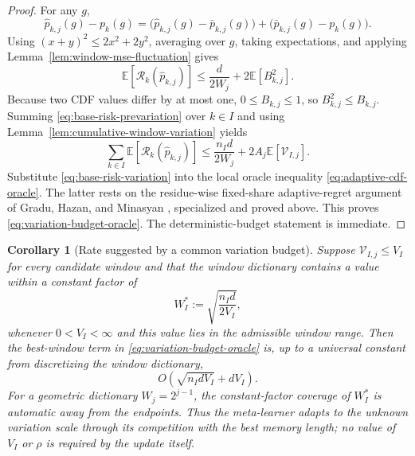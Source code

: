 \documentclass[11pt]{article}
\newtheorem{corollary}[theorem]{Corollary}
\newcommand{\E}{\mathbb{E}}
\newcommand{\1}{\mathbf{1}}
\begin{document}
\begin{proof}
For any $g$,
\[
    \widehat p_{k,j}(g)-p_k(g)
    =
    \bigl(\widehat p_{k,j}(g)-\bar p_{k,j}(g)\bigr)
    +
    \bigl(\bar p_{k,j}(g)-p_k(g)\bigr).
\]
Using $(x+y)^2\le2x^2+2y^2$, averaging over $g$, taking expectations, and
applying Lemma~\ref{lem:window-mse-fluctuation} gives
\begin{equation}
    \E[\mathcal R_k(\widehat p_{k,j})]
    \le
    \frac{d}{2W_j}
    +
    2\E[B_{k,j}^2].
    \label{eq:base-risk-prevariation}
\end{equation}
Because two CDF values differ by at most one, $0\le B_{k,j}\le1$, so
$B_{k,j}^2\le B_{k,j}$.  Summing
\eqref{eq:base-risk-prevariation} over $k\in I$ and using
Lemma~\ref{lem:cumulative-window-variation} yields
\begin{equation}
    \sum_{k\in I}
    \E[\mathcal R_k(\widehat p_{k,j})]
    \le
    \frac{n_I d}{2W_j}
    +
    2A_j\E[\mathcal V_{I,j}].
    \label{eq:base-risk-variation}
\end{equation}
Substitute \eqref{eq:base-risk-variation} into the local oracle inequality
\eqref{eq:adaptive-cdf-oracle}.  The latter rests on the residue-wise
fixed-share adaptive-regret argument of Gradu, Hazan, and Minasyan
\cite{gradu2023}, specialized and proved above.  This proves
\eqref{eq:variation-budget-oracle}.  The deterministic-budget statement is
immediate.
\end{proof}

\begin{corollary}[Rate suggested by a common variation budget]
\label{cor:variation-budget-rate}
Suppose $\mathcal V_{I,j}\le V_I$ for every candidate window and that the
window dictionary contains a value within a constant factor of
\[
    W_I^*
    :=
    \sqrt{\frac{n_I d}{2V_I}},
    \label{eq:variation-optimal-window}
\]
whenever $0<V_I<\infty$ and this value lies in the admissible window range.
Then the best-window term in \eqref{eq:variation-budget-oracle} is, up to a
universal constant from discretizing the window dictionary,
\begin{equation}
    O\!\left(
        \sqrt{n_I d V_I}
        +
        dV_I
    \right).
    \label{eq:variation-rate}
\end{equation}
For a geometric dictionary $W_j=2^{j-1}$, the constant-factor coverage of
$W_I^*$ is automatic away from the endpoints.  Thus the meta-learner adapts to
the unknown variation scale through its competition with the best memory
length; no value of $V_I$ or $\rho$ is required by the update itself.
\end{corollary}
\end{document}
